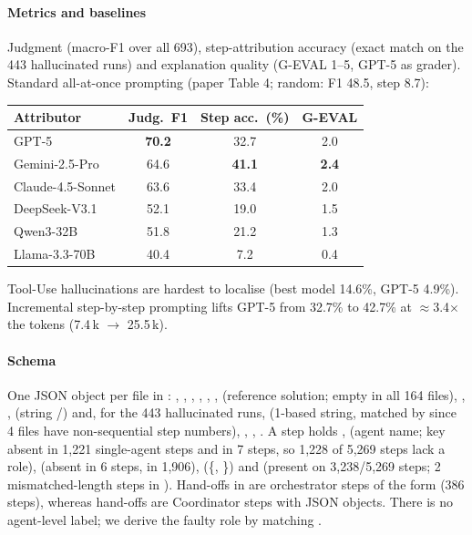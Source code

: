 \paragraph{Metrics and baselines} Judgment (macro-F1 over all 693), step-attribution accuracy (exact match on the 443 hallucinated runs) and explanation quality (G-EVAL 1--5, GPT-5 as grader). Standard all-at-once prompting (paper Table 4; random: F1 48.5, step 8.7):

\begin{center}\small
\begin{tabular}{@{}lccc@{}}\toprule
Attributor & Judg.\ F1 & Step acc.\ (\%) & G-EVAL\\\midrule
GPT-5 & \textbf{70.2} & 32.7 & 2.0\\
Gemini-2.5-Pro & 64.6 & \textbf{41.1} & \textbf{2.4}\\
Claude-4.5-Sonnet & 63.6 & 33.4 & 2.0\\
DeepSeek-V3.1 & 52.1 & 19.0 & 1.5\\
Qwen3-32B & 51.8 & 21.2 & 1.3\\
Llama-3.3-70B & 40.4 & 7.2 & 0.4\\\bottomrule
\end{tabular}
\end{center}
Tool-Use hallucinations are hardest to localise (best model 14.6\%, GPT-5 4.9\%). Incremental step-by-step prompting lifts GPT-5 from 32.7\% to 42.7\% at $\approx$3.4$\times$ the tokens (7.4\,k $\to$ 25.5\,k).

\paragraph{Schema} One JSON object per file in : , , , , , ,  (reference solution; empty in all 164  files), , ,  (string /) and, for the 443 hallucinated runs,  (1-based string, matched by  since 4 files have non-sequential step numbers), , , . A step holds ,  (agent name; key absent in 1,221 single-agent steps and  in 7  steps, so 1,228 of 5,269 steps lack a role),  (absent in 6 steps,  in 1,906),  (\{, \}) and  (present on 3,238/5,269 steps; 2 mismatched-length steps in ). Hand-offs in  are orchestrator steps of the form  (386 steps), whereas  hand-offs are Coordinator steps with JSON  objects. There is no agent-level label; we derive the faulty role by matching .

